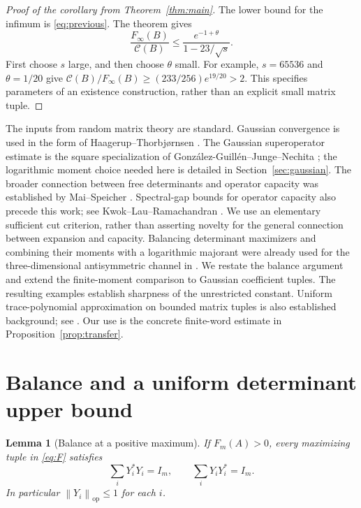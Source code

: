 \documentclass[11pt]{article}
\newtheorem{lemma}[theorem]{Lemma}
\theoremstyle{remark}
\newcommand{\op}{\mathrm{op}}
\newcommand{\Finf}{F_{\infty}}
\newcommand{\calC}{\mathcal C}
\newcommand{\norm}[1]{\left\lVert#1\right\rVert}
\begin{document}
\begin{proof}[Proof of the corollary from Theorem~\ref{thm:main}]
The lower bound for the infimum is \eqref{eq:previous}.
The theorem gives
\[
 \frac{\Finf(B)}{\calC(B)}
 \leq\frac{e^{-1+\theta}}{1-23/\sqrt{s}}.
\]
First choose $s$ large, and then choose $\theta$ small.
For example, $s=65536$ and $\theta=1/20$ give
$\calC(B)/\Finf(B)\geq(233/256)e^{19/20}>2$.
This specifies parameters of an existence construction, rather than
an explicit small matrix tuple.
\end{proof}

The inputs from random matrix theory are standard. Gaussian
convergence is used in the form of
Haagerup--Thorbj{\o}rnsen \cite[Theorem~A and (1.2)]{HT}.
The Gaussian superoperator estimate is the square specialization
of Gonz\'alez-Guill\'en--Junge--Nechita
\cite[Lemma~5.3 and Proposition~5.4]{GJN}; the logarithmic moment
choice needed here is detailed in Section~\ref{sec:gaussian}.
The broader connection between free determinants and operator
capacity was established by Mai--Speicher \cite{MS}.
Spectral-gap bounds for operator capacity also precede this work;
see Kwok--Lau--Ramachandran \cite[Theorem~1.8]{KLR}.
We use an elementary sufficient cut criterion, rather than
asserting novelty for the general connection between expansion
and capacity. Balancing determinant maximizers and combining their
moments with a logarithmic majorant were already used for the
three-dimensional antisymmetric channel in
\cite[Lemmas \emph{Balancing at a nonsingular maximum} and
\emph{Logarithmic moment bound}]{ErikssonAntisymmetric}.
We restate the balance argument and extend the finite-moment
comparison to Gaussian coefficient tuples. The resulting examples
establish sharpness of the unrestricted constant.
Uniform trace-polynomial approximation on bounded matrix tuples
is also established background; see
\cite[Section~3.3, Definition~3.4 and Lemma~3.6]{Jekel}.
Our use is the concrete finite-word estimate in
Proposition~\ref{prop:transfer}.

\section{Balance and a uniform determinant upper bound}
\label{sec:upper}

\begin{lemma}[Balance at a positive maximum]\label{lem:balance}
If $F_m(A)>0$, every maximizing tuple in \eqref{eq:F} satisfies
\begin{equation}
 \sum_iY_i^*Y_i=I_m,\qquad \sum_iY_iY_i^*=I_m. \label{eq:balance}
\end{equation}
In particular $\norm{Y_i}_{\op}\leq1$ for each $i$.
\end{lemma}
\end{document}
